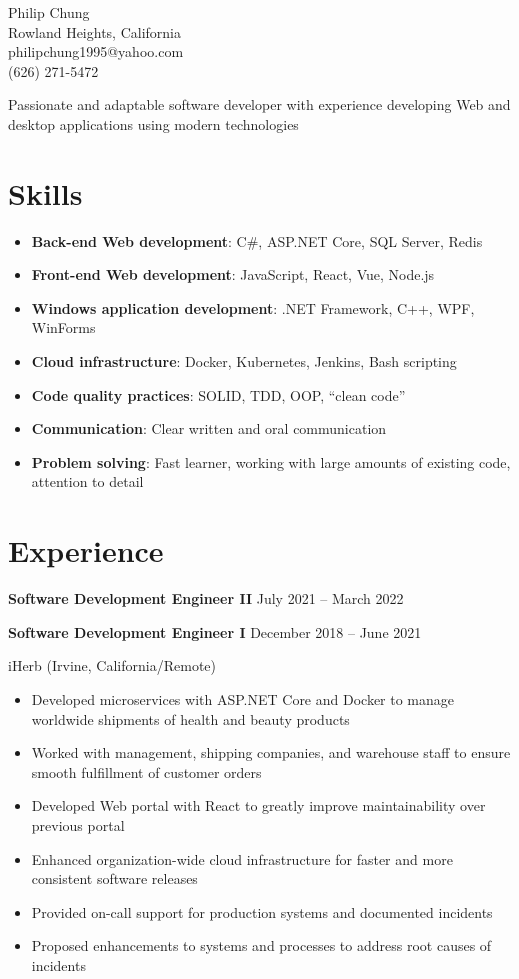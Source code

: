 \documentclass[10pt]{article}
\newcommand{\titleheader}[2]{\textbf{#1} \hfill #2}
\newcommand{\locheader}[2]{#1 (#2)}
\begin{document}
	\begin{center}
		{\LARGE Philip Chung} \\
		Rowland Heights, California \\
		philipchung1995@yahoo.com \\
		(626) 271-5472 \\
	\end{center}

	Passionate and adaptable software developer with experience developing Web and desktop applications using modern technologies

	\section*{Skills}

	\newcommand{\skillitem}[2]{\item \textbf{#1}: #2}

	\begin{itemize}
		\skillitem{Back-end Web development}{C\#, ASP.NET Core, SQL Server, Redis}
		\skillitem{Front-end Web development}{JavaScript, React, Vue, Node.js}
		\skillitem{Windows application development}{.NET Framework, C++, WPF, WinForms}
		\skillitem{Cloud infrastructure}{Docker, Kubernetes, Jenkins, Bash scripting}
		\skillitem{Code quality practices}{SOLID, TDD, OOP, ``clean code''}
		\skillitem{Communication}{Clear written and oral communication}
		\skillitem{Problem solving}{Fast learner, working with large amounts of existing code, attention to detail}
	\end{itemize}

	\section*{Experience}

	\titleheader{Software Development Engineer II}{July 2021 -- March 2022}

	\titleheader{Software Development Engineer I}{December 2018 -- June 2021}

	\locheader{iHerb}{Irvine, California/Remote}

	\begin{itemize}
		\item Developed microservices with ASP.NET Core and Docker to manage worldwide shipments of health and beauty products
		\item Worked with management, shipping companies, and warehouse staff to ensure smooth fulfillment of customer orders
		\item Developed Web portal with React to greatly improve maintainability over previous portal
		\item Enhanced organization-wide cloud infrastructure for faster and more consistent software releases
		\item Provided on-call support for production systems and documented incidents
		\item Proposed enhancements to systems and processes to address root causes of incidents
	\end{itemize}
\end{document}
